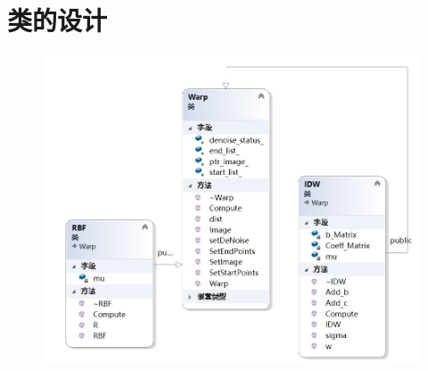 \documentclass{article}
\begin{document}
	\section{类的设计}
	\begin{figure}[htb]
		\begin{center}
			\includegraphics[width=7in]{class1.jpg}
		\end{center}
	\end{figure}
	\clearpage
\end{document}

